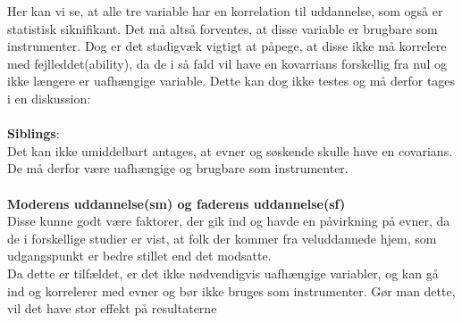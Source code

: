 \documentclass[
  10pt,
]{article}
\newenvironment{Shaded}{\begin{snugshade}}{\end{snugshade}}
\newcommand{\CommentTok}[1]{\textcolor[rgb]{0.56,0.35,0.01}{\textit{#1}}}
\begin{document}
\begin{Shaded}
\end{Shaded}

Her kan vi se, at alle tre variable har en korrelation til uddannelse,
som også er statistisk siknifikant. Det må altså forventes, at disse
variable er brugbare som instrumenter. Dog er det stadigvæk vigtigt at
påpege, at disse ikke må korrelere med fejlleddet(ability), da de i så
fald vil have en kovarrians forskellig fra nul og ikke længere er
uafhængige variable. Dette kan dog ikke testes og må derfor tages i en
diskussion:\\
~\\
\textbf{Siblings}:\\
Det kan ikke umiddelbart antages, at evner og søskende skulle have en
covarians. De må derfor være uafhængige og brugbare som instrumenter.\\
~\\
\textbf{Moderens uddannelse(sm) og faderens uddannelse(sf)}\\
Disse kunne godt være faktorer, der gik ind og havde en påvirkning på
evner, da de i forskellige studier er vist, at folk der kommer fra
veluddannede hjem, som udgangspunkt er bedre stillet end det modsatte.\\
Da dette er tilfældet, er det ikke nødvendigvis uafhængige variabler, og
kan gå ind og korrelerer med evner og bør ikke bruges som instrumenter.
Gør man dette, vil det have stor effekt på resultaterne \newpage
\end{document}
